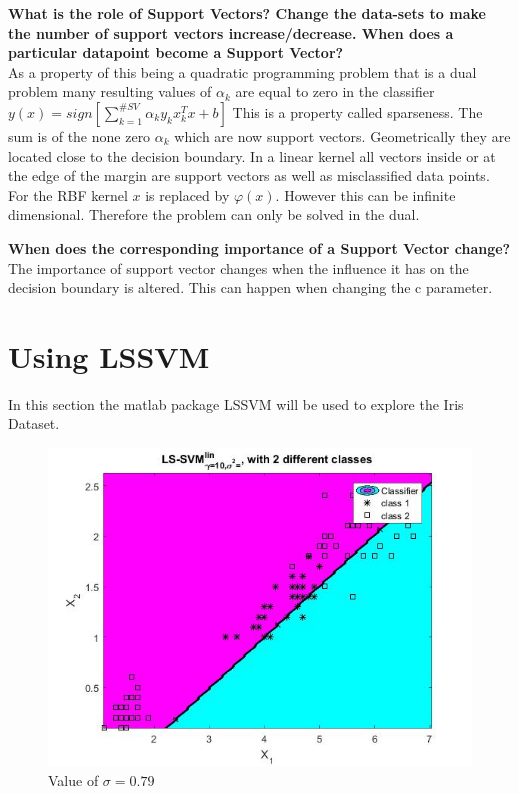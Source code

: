 \documentclass[11pt,oneside,a4paper]{article}
\begin{document}
\textbf{What is the role of Support Vectors? Change the data-sets to make the number of support vectors
increase/decrease. When does a particular datapoint become a Support Vector?}\\
	As a property of this being a quadratic programming problem that is  a dual problem many resulting values of $ \alpha_{k}$ are equal to zero in the classifier $ y(x)= sign[\sum_{k = 1}^{\#SV} \alpha_{k} y_{k} x_{k}^{T}x + b] $ This is a property called sparseness. The sum is of the none zero $\alpha_{k}$ which are now support vectors. Geometrically they are located close to the decision boundary. In a linear kernel all vectors inside or at the edge of the margin are support vectors as well as misclassified data points. For the RBF kernel $x$ is replaced by $\varphi(x)$. However this can be infinite dimensional. Therefore the problem can only be solved in the dual. 
	
\textbf{When does the corresponding importance of a Support Vector change?}\\
The importance of support vector changes when the influence it has on the decision boundary is altered. This can happen when changing the c parameter.

\section{Using LSSVM}
In this section the matlab package LSSVM will be used to explore the Iris Dataset.

\begin{figure}[H]
	\centering
	\includegraphics[scale=0.5]{../Figures/iris_intial}
	\caption{Value of $\sigma = 0.79$}
\end{figure}
\end{document}
